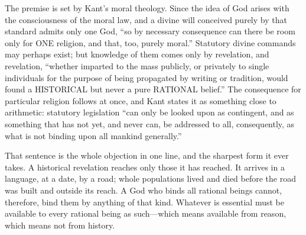 The premise is set by Kant's moral theology. Since the idea of God arises with the consciousness of the moral law, and a divine will conceived purely by that standard admits only one God, ``so by necessary consequence can there be room only for ONE religion, and that, too, purely moral.'' Statutory divine commands may perhaps exist; but knowledge of them comes only by revelation, and revelation, ``whether imparted to the mass publicly, or privately to single individuals for the purpose of being propagated by writing or tradition, would found a HISTORICAL but never a pure RATIONAL belief.'' The consequence for particular religion follows at once, and Kant states it as something close to arithmetic: statutory legislation ``can only be looked upon as contingent, and as something that has not yet, and never can, be addressed to all, consequently, as what is not binding upon all mankind generally.''

That sentence is the whole objection in one line, and the sharpest form it ever takes. A historical revelation reaches only those it has reached. It arrives in a language, at a date, by a road; whole populations lived and died before the road was built and outside its reach. A God who binds all rational beings cannot, therefore, bind them by anything of that kind. Whatever is essential must be available to every rational being as such---which means available from reason, which means not from history.

